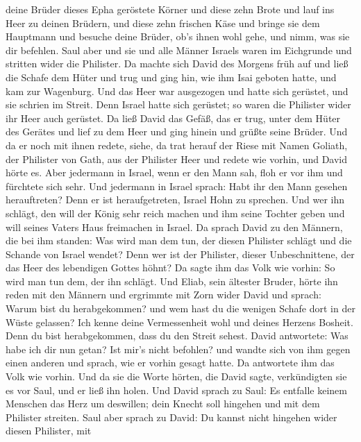 deine Brüder dieses Epha geröstete Körner und diese zehn Brote und lauf
ins Heer zu deinen Brüdern,  und diese zehn frischen Käse
und bringe sie dem Hauptmann und besuche deine Brüder, ob's ihnen wohl
gehe, und nimm, was sie dir befehlen.  Saul aber und sie
und alle Männer Israels waren im Eichgrunde und stritten wider die
Philister.  Da machte sich David des Morgens früh auf und
ließ die Schafe dem Hüter und trug und ging hin, wie ihm Isai geboten
hatte, und kam zur Wagenburg. Und das Heer war ausgezogen und hatte sich
gerüstet, und sie schrien im Streit.  Denn Israel hatte
sich gerüstet; so waren die Philister wider ihr Heer auch gerüstet.
 Da ließ David das Gefäß, das er trug, unter dem Hüter des
Gerätes und lief zu dem Heer und ging hinein und grüßte seine Brüder.
 Und da er noch mit ihnen redete, siehe, da trat herauf der
Riese mit Namen Goliath, der Philister von Gath, aus der Philister Heer
und redete wie vorhin, und David hörte es.  Aber jedermann
in Israel, wenn er den Mann sah, floh er vor ihm und fürchtete sich
sehr.  Und jedermann in Israel sprach: Habt ihr den Mann
gesehen herauftreten? Denn er ist heraufgetreten, Israel Hohn zu
sprechen. Und wer ihn schlägt, den will der König sehr reich machen und
ihm seine Tochter geben und will seines Vaters Haus freimachen in
Israel.  Da sprach David zu den Männern, die bei ihm
standen: Was wird man dem tun, der diesen Philister schlägt und die
Schande von Israel wendet? Denn wer ist der Philister, dieser
Unbeschnittene, der das Heer des lebendigen Gottes höhnt? 
Da sagte ihm das Volk wie vorhin: So wird man tun dem, der ihn schlägt.
 Und Eliab, sein ältester Bruder, hörte ihn reden mit den
Männern und ergrimmte mit Zorn wider David und sprach: Warum bist du
herabgekommen? und wem hast du die wenigen Schafe dort in der Wüste
gelassen? Ich kenne deine Vermessenheit wohl und deines Herzens Bosheit.
Denn du bist herabgekommen, dass du den Streit sehest. 
David antwortete: Was habe ich dir nun getan? Ist mir's nicht befohlen?
 und wandte sich von ihm gegen einen anderen und sprach,
wie er vorhin gesagt hatte. Da antwortete ihm das Volk wie vorhin.
 Und da sie die Worte hörten, die David sagte, verkündigten
sie es vor Saul, und er ließ ihn holen.  Und David sprach
zu Saul: Es entfalle keinem Menschen das Herz um deswillen; dein Knecht
soll hingehen und mit dem Philister streiten.  Saul aber
sprach zu David: Du kannst nicht hingehen wider diesen Philister, mit
